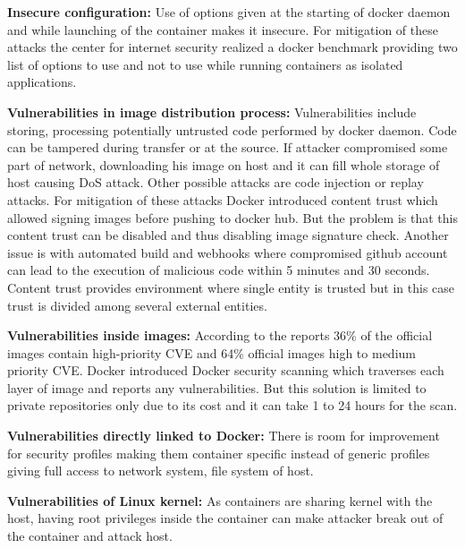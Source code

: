 \textbf{Insecure configuration:} Use of options given at the starting of docker daemon 
and while launching of the container makes it insecure. For mitigation of these 
attacks the center for internet security realized a docker benchmark providing 
two list of options to use and not to use while running containers as isolated 
applications.

\textbf{Vulnerabilities in image distribution process:} Vulnerabilities include storing, 
processing potentially untrusted code performed by docker daemon. Code can be 
tampered during transfer or at the source. If attacker compromised some part of 
network, downloading his image on host and it can fill whole storage of host 
causing DoS attack. Other possible attacks are code injection or replay attacks. 
For mitigation of these attacks Docker introduced content trust which allowed 
signing images before pushing to docker hub. But the problem is that this content 
trust can be disabled and thus disabling image signature check. Another issue is 
with automated build and webhooks where compromised github account can lead to the 
execution of malicious code within 5 minutes and 30 seconds. Content trust provides 
environment where single entity is trusted but in this case trust is divided among 
several external entities.

\textbf{Vulnerabilities inside images:} According to the reports 36\% of the official images 
contain high-priority CVE and 64\% official images high to medium priority CVE. Docker 
introduced Docker security scanning which traverses each layer of image and reports 
any vulnerabilities. But this solution is limited to private repositories only due to 
its cost and it can take 1 to 24 hours for the scan.

\textbf{Vulnerabilities directly linked to Docker:} There is room for improvement for security
profiles making them container specific instead of generic profiles giving full access 
to network system, file system of host.

\textbf{Vulnerabilities of Linux kernel:} As containers are sharing kernel with the host, having
root privileges inside the container can make attacker break out of the container and 
attack host.


